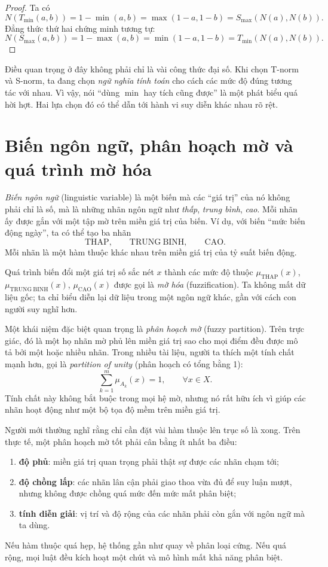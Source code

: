 \begin{proof}
Ta có
\[
N(T_{\min}(a,b))=1-\min(a,b)=\max(1-a,1-b)=S_{\max}(N(a),N(b)).
\]
Đẳng thức thứ hai chứng minh tương tự:
\[
N(S_{\max}(a,b))=1-\max(a,b)=\min(1-a,1-b)=T_{\min}(N(a),N(b)).
\]
\end{proof}

Điều quan trọng ở đây không phải chỉ là vài công thức đại số. Khi chọn T-norm và S-norm, ta đang chọn \emph{ngữ nghĩa tính toán} cho cách các mức độ đúng tương tác với nhau. Vì vậy, nói ``dùng \(\min\) hay tích cũng được'' là một phát biểu quá hời hợt. Hai lựa chọn đó có thể dẫn tới hành vi suy diễn khác nhau rõ rệt.

\section{Biến ngôn ngữ, phân hoạch mờ và quá trình mờ hóa}

\emph{Biến ngôn ngữ} (linguistic variable) là một biến mà các ``giá trị'' của nó không phải chỉ là số, mà là những nhãn ngôn ngữ như \emph{thấp}, \emph{trung bình}, \emph{cao}. Mỗi nhãn ấy được gắn với một tập mờ trên miền giá trị của biến. Ví dụ, với biến ``mức biến động ngày'', ta có thể tạo ba nhãn
\[
\mathrm{THAP},\qquad \mathrm{TRUNG\ BINH},\qquad \mathrm{CAO}.
\]
Mỗi nhãn là một hàm thuộc khác nhau trên miền giá trị của tỷ suất biến động.

Quá trình biến đổi một giá trị số sắc nét \(x\) thành các mức độ thuộc \(\mu_{\mathrm{THAP}}(x)\), \(\mu_{\mathrm{TRUNG\ BINH}}(x)\), \(\mu_{\mathrm{CAO}}(x)\) được gọi là \emph{mờ hóa} (fuzzification). Ta không mất dữ liệu gốc; ta chỉ biểu diễn lại dữ liệu trong một ngôn ngữ khác, gần với cách con người suy nghĩ hơn.

Một khái niệm đặc biệt quan trọng là \emph{phân hoạch mờ} (fuzzy partition). Trên trực giác, đó là một họ nhãn mờ phủ lên miền giá trị sao cho mọi điểm đều được mô tả bởi một hoặc nhiều nhãn. Trong nhiều tài liệu, người ta thích một tính chất mạnh hơn, gọi là \emph{partition of unity} (phân hoạch có tổng bằng 1):
\[
\sum_{k=1}^m \mu_{A_k}(x)=1,\qquad \forall x\in X.
\]
Tính chất này không bắt buộc trong mọi hệ mờ, nhưng nó rất hữu ích vì giúp các nhãn hoạt động như một bộ tọa độ mềm trên miền giá trị.

Người mới thường nghĩ rằng chỉ cần đặt vài hàm thuộc lên trục số là xong. Trên thực tế, một phân hoạch mờ tốt phải cân bằng ít nhất ba điều:
\begin{enumerate}
\item \textbf{độ phủ}: miền giá trị quan trọng phải thật sự được các nhãn chạm tới;
\item \textbf{độ chồng lấp}: các nhãn lân cận phải giao thoa vừa đủ để suy luận mượt, nhưng không được chồng quá mức đến mức mất phân biệt;
\item \textbf{tính diễn giải}: vị trí và độ rộng của các nhãn phải còn gắn với ngôn ngữ mà ta dùng.
\end{enumerate}
Nếu hàm thuộc quá hẹp, hệ thống gần như quay về phân loại cứng. Nếu quá rộng, mọi luật đều kích hoạt một chút và mô hình mất khả năng phân biệt.

